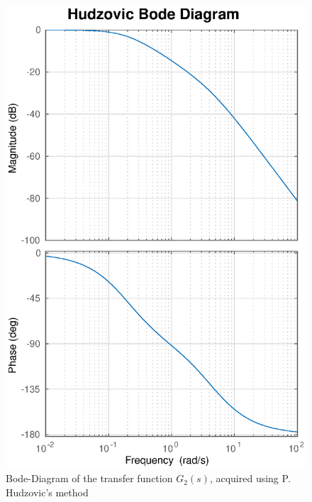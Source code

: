 \begin{figure}
    \centering
    \includegraphics[width=\linewidth]{images/hudzovic_bode}
    \caption{Bode-Diagram of the transfer function $G_2(s)$, acquired using P. Hudzovic's method}
    \label{fig:hudzovic_bode}
\end{figure}

\clearpage
